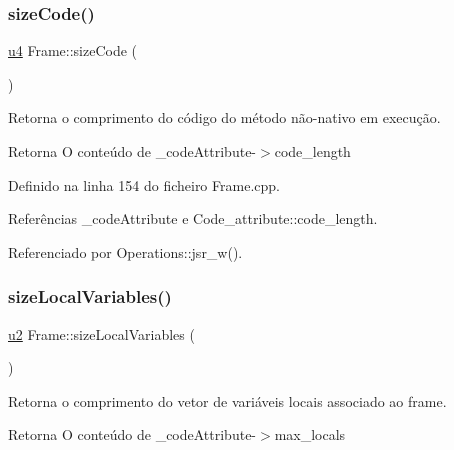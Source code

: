 \mbox{\label{classFrame_a3151aeb977a24c464ed8930c9100715d}} 
\subsubsection{\texorpdfstring{size\+Code()}{sizeCode()}}
{\footnotesize\ttfamily \hyperlink{BasicTypes_8h_ae5be1f726785414dd1b77d60df074c9d}{u4} Frame\+::size\+Code (\begin{DoxyParamCaption}{ }\end{DoxyParamCaption})}



Retorna o comprimento do código do método não-\/nativo em execução. 

\begin{DoxyReturn}{Retorna}
O conteúdo de \+\_\+code\+Attribute-\/$>$code\+\_\+length 
\end{DoxyReturn}


Definido na linha 154 do ficheiro Frame.\+cpp.



Referências \+\_\+code\+Attribute e Code\+\_\+attribute\+::code\+\_\+length.



Referenciado por Operations\+::jsr\+\_\+w().

\mbox{\label{classFrame_a2b65f6fa2195970fd25d69c17b5ca933}} 
\subsubsection{\texorpdfstring{size\+Local\+Variables()}{sizeLocalVariables()}}
{\footnotesize\ttfamily \hyperlink{BasicTypes_8h_a732cde1300aafb73b0ea6c2558a7a54f}{u2} Frame\+::size\+Local\+Variables (\begin{DoxyParamCaption}{ }\end{DoxyParamCaption})}



Retorna o comprimento do vetor de variáveis locais associado ao frame. 

\begin{DoxyReturn}{Retorna}
O conteúdo de \+\_\+code\+Attribute-\/$>$max\+\_\+locals 
\end{DoxyReturn}


